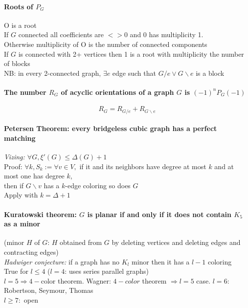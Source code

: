 \documentclass[12pt]{article}
\begin{document}
\paragraph{Roots of $P_G$\\}
O is a root\\
If $G$ connected all coefficients are $<>0$ and $0$ has multiplicity 1.\\
Otherwise multiplicity of O is the number of connected components\\
If $G$ is connected with 2+ vertices then 1 is a root with multiplicity the number of blocks\\
NB: in every 2-connected graph, $\exists e$ edge such that $G/e \vee G \backslash e$ is a block\\

\paragraph{The number $R_G$ of acyclic orientations of a graph $G$ is $(-1)^n P_G(-1)$}
\[ R_G = R_{G/e} + R_{G \backslash e} \]

\paragraph{Petersen Theorem: every bridgeless cubic graph has a perfect matching\\}
\emph{Vizing: $\forall G, \xi'(G) \leqslant \Delta(G)+1$\\}
Proof: $\forall k, S_k := \forall v \in V,$ if it and its neighbors have degree at most $k$ and at most one has degree $k$,\\
then if $G \backslash v$ has a $k$-edge coloring so does $G$\\
Apply with $k = \Delta+1$\\

\paragraph{Kuratowski theorem: $G$ is planar if and only if it does not contain $K_5$ as a minor\\}
(minor $H$ of $G$: $H$ obtained from $G$ by deleting vertices and deleting edges and contracting edges)\\
\emph{Hadwiger conjecture:} if a graph has no $K_l$ minor then it has a $l-1$ coloring\\
True for $l \leqslant 4$ ($l=4$: uses series parallel graphs)\\
$l=5 \Rightarrow 4-$color theorem. Wagner: $4-color$ theorem $\Rightarrow l=5$ case.
$l=6:$ Robertson, Seymour, Thomas\\
$l \geqslant 7:$ open\\
\end{document}
